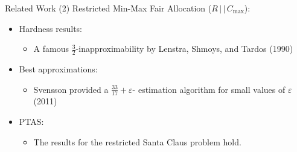 \begin{frame}[t]{Related Work (2)}
	Restricted Min-Max Fair Allocation ($R \, | \, | \, C_{\max}$):
	    \begin{itemize}
    	    \item<2-> Hardness results:
                \begin{itemize}
        	        \item<3-> A famous $\frac{3}{2}$-inapproximability by Lenstra, Shmoys, and Tardos (1990)
                \end{itemize}
            \item<4-> Best approximations:
                \begin{itemize}
                    \item<5-> Svensson provided a $\frac{33}{17} + \varepsilon$- estimation algorithm for small values of $\varepsilon$ (2011)
                \end{itemize}
            \item<6-> PTAS:
                \begin{itemize}
                    \item<7-> The results for the restricted Santa Claus problem hold.
                \end{itemize}
        \end{itemize}
\end{frame}

